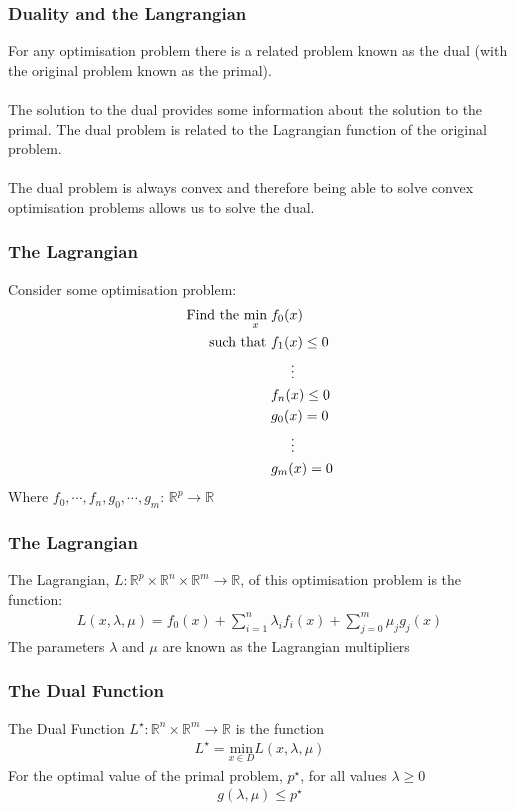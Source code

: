 \documentclass{beamer}
\def\rnum{\mathbb{R}}
\begin{document}
\begin{frame}
    \frametitle{Duality and the Langrangian}
    For any optimisation problem there is a related problem known as the dual
    (with the original problem known as the primal).
    \\~\\
    The solution to the dual provides some information about the solution to the
    primal. The dual problem is related to the Lagrangian function of the
    original problem.
    \\~\\
    The dual problem is always convex and therefore being able to solve
    convex optimisation problems allows us to solve the dual.
\end{frame}

\begin{frame}
    \frametitle{The Lagrangian}
    Consider some optimisation problem:
    {\footnotesize
    \begin{align*}
        \text{Find the }\underset{x}{\text{min}}\; &f_{0}(x) \\
        \text{  such that }&f_{1}(x) \leq 0 \\
        & \hspace{5mm} \vdots \\
        &f_{n}(x) \leq 0 \\
        &g_{0}(x) = 0 \\
        &\hspace{5mm} \vdots \\
        &g_{m}(x) = 0
    \end{align*}}
    Where $f_0,\cdots, f_n, g_0, \cdots, g_m:\, \rnum^{p} \rightarrow \rnum$
\end{frame}

\begin{frame}
    \frametitle{The Lagrangian}
    The Lagrangian, $L : \rnum^{p} \times \rnum^{n} \times \rnum^{m} \rightarrow
    \rnum$, of this optimisation problem is the function:
    \begin{align*}
        L(x, \lambda, \mu) = f_{0}(x) + \sum\limits_{i=1}^{n}\lambda_{i} f_{i}(x) +
        \sum\limits_{j=0}^{m}\mu_{j}g_{j}(x)
    \end{align*}
    The parameters $\lambda$ and $\mu$ are known as the Lagrangian multipliers
\end{frame}

\begin{frame}
    \frametitle{The Dual Function}
    The Dual Function $L^{\star}: \rnum^{n}\times\rnum^{m} \rightarrow \rnum$ is
    the function
    \begin{align*}
        L^{\star} = \underset{x \in D}{\text{min}}L(x, \lambda, \mu)
    \end{align*}
    For the optimal value of the primal problem, $p^{\star}$, for all values
    $\lambda \geq 0$
    \begin{align*}
        g(\lambda, \mu) \leq p^{\star}
    \end{align*}
\end{frame}
\end{document}
